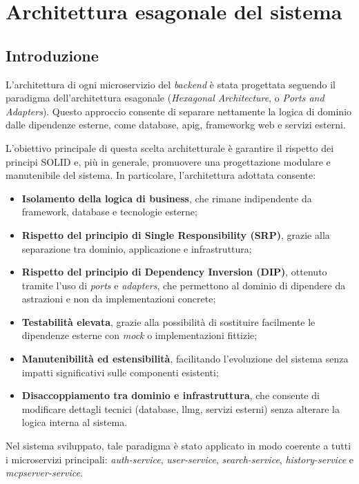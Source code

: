 \chapter{Architettura esagonale del sistema}
\label{appendix:hexagonal-architecture}

\section{Introduzione}

L’architettura di ogni microservizio del \textit{backend} è stata progettata seguendo il paradigma
dell’architettura esagonale (\textit{Hexagonal Architecture}, o \textit{Ports and Adapters}).
Questo approccio consente di separare nettamente la logica di dominio
dalle dipendenze esterne, come database, \gls{apig}, \gls{frameworkg} web e servizi esterni.

L’obiettivo principale di questa scelta architetturale è garantire il rispetto
dei principi SOLID e, più in generale, promuovere una progettazione modulare
e manutenibile del sistema. In particolare, l’architettura adottata consente:
\begin{itemize}
    \item \textbf{Isolamento della logica di business}, che rimane indipendente
    da framework, database e tecnologie esterne;

    \item \textbf{Rispetto del principio di Single Responsibility (SRP)},
    grazie alla separazione tra dominio, applicazione e infrastruttura;

    \item \textbf{Rispetto del principio di Dependency Inversion (DIP)},
    ottenuto tramite l’uso di \textit{ports} e \textit{adapters}, che permettono
    al dominio di dipendere da astrazioni e non da implementazioni concrete;

    \item \textbf{Testabilità elevata}, grazie alla possibilità di sostituire
    facilmente le dipendenze esterne con \textit{mock} o implementazioni fittizie;

    \item \textbf{Manutenibilità ed estensibilità}, facilitando l’evoluzione del
    sistema senza impatti significativi sulle componenti esistenti;

    \item \textbf{Disaccoppiamento tra dominio e infrastruttura}, che consente
    di modificare dettagli tecnici (database, \gls{llmg}, servizi esterni) senza
    alterare la logica interna al sistema.
\end{itemize}
Nel sistema sviluppato, tale paradigma è stato applicato in modo coerente
a tutti i microservizi principali: \textit{auth-service}, \textit{user-service},
\textit{search-service}, \textit{history-service} e \textit{mcpserver-service}.

